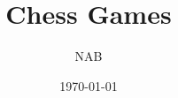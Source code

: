\documentclass[twocolumn]{article}
\begin{document}
 \title{Chess Games}
 \author{NAB}
 \date{\today}
 \maketitle{}
 \tableofcontents
%





\end{document}
